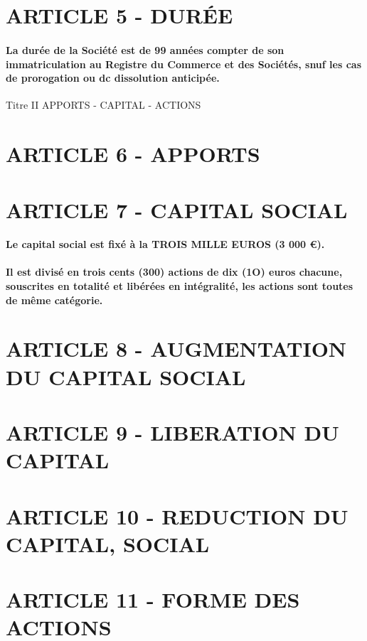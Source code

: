 \documentclass[a4paper, 11pt]{article}
\begin{document}
\section*{ARTICLE 5 - DURÉE}

\paragraph{
  La durée de la Société est de 99 années compter de son immatriculation au Registre du Commerce et des Sociétés, snuf les cas de prorogation ou dc dissolution anticipée.
}

Titre II
APPORTS - CAPITAL - ACTIONS

\section*{ARTICLE 6 - APPORTS}

\section*{ARTICLE 7 - CAPITAL SOCIAL}

\paragraph{
  Le capital social est fixé à la TROIS MILLE EUROS (3 000 €).
}

\paragraph{
  Il est divisé en trois cents (300) actions de dix (1O) euros chacune, souscrites en totalité et libérées en intégralité, les actions sont toutes de même catégorie.
}

\section*{ARTICLE 8 - AUGMENTATION DU CAPITAL SOCIAL}

\section*{ARTICLE 9 - LIBERATION DU CAPITAL}

\section*{ARTICLE 10 - REDUCTION DU CAPITAL, SOCIAL}

\section*{ARTICLE 11 - FORME DES ACTIONS}
\end{document}
